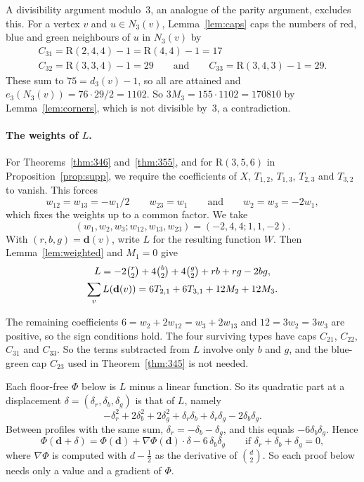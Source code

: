 \documentclass[11pt]{article}
\theoremstyle{spacedplain}
\theoremstyle{spaceddef}
\theoremstyle{spacedremark}
\newcommand{\R}{\mathrm{R}}
\begin{document}
A divisibility argument modulo~$3$, an analogue of the parity argument, excludes this.
For a vertex $v$ and $u\in N_3(v)$, Lemma~\ref{lem:caps} caps the numbers of red, blue and green neighbours of $u$ in $N_3(v)$ by
\begin{gather*}
C_{31}=\R(2,4,4)-1=\R(4,4)-1=17\\
C_{32}=\R(3,3,4)-1=29\qquad\text{and}\qquad C_{33}=\R(3,4,3)-1=29.
\end{gather*}
These sum to $75=d_3(v)-1$, so all are attained and $e_3(N_3(v))=76\cdot 29/2=1102$.
So $3M_3=155\cdot1102=170810$ by Lemma~\ref{lem:corners}, which is not divisible by~$3$, a contradiction.

\paragraph{The weights of $L$.}
For Theorems~\ref{thm:346} and~\ref{thm:355}, and for $\R(3,5,6)$ in Proposition~\ref{prop:supp}, we require the coefficients of $X$, $T_{1,2}$, $T_{1,3}$, $T_{2,3}$ and $T_{3,2}$ to vanish.
This forces
\[
w_{12}=w_{13}=-w_1/2\qquad w_{23}=w_1\qquad\text{and}\qquad w_2=w_3=-2w_1,
\]
which fixes the weights up to a common factor.
We take
\[
(w_1,w_2,w_3;w_{12},w_{13},w_{23})=(-2,4,4;1,1,-2).
\]
With $(r,b,g)=\mathbf d(v)$, write $L$ for the resulting function $W$.
Then Lemma~\ref{lem:weighted} and $M_1=0$ give
\begin{equation}\label{eq:L}
\begin{gathered}
L=-2\tbinom r2+4\tbinom b2+4\tbinom g2+rb+rg-2bg,\\
\sum_vL(\mathbf d(v))=6T_{2,1}+6T_{3,1}+12M_2+12M_3 .
\end{gathered}
\end{equation}

The remaining coefficients $6=w_2+2w_{12}=w_3+2w_{13}$ and $12=3w_2=3w_3$ are positive, so the sign conditions hold.
The four surviving types have caps $C_{21}$, $C_{22}$, $C_{31}$ and $C_{33}$.
So the terms subtracted from $L$ involve only $b$ and $g$, and the blue-green cap $C_{23}$ used in Theorem~\ref{thm:345} is not needed.

Each floor-free $\Phi$ below is $L$ minus a linear function.
So its quadratic part at a displacement $\delta=(\delta_r,\delta_b,\delta_g)$ is that of $L$, namely
\[
-\delta_r^2+2\delta_b^2+2\delta_g^2+\delta_r\delta_b+\delta_r\delta_g-2\delta_b\delta_g .
\]
Between profiles with the same sum, $\delta_r=-\delta_b-\delta_g$, and this equals $-6\delta_b\delta_g$.
Hence
\[
\Phi(\mathbf d+\delta)=\Phi(\mathbf d)+\nabla\Phi(\mathbf d)\cdot\delta-6\,\delta_b\delta_g\qquad\text{if }\delta_r+\delta_b+\delta_g=0,
\]
where $\nabla\Phi$ is computed with $d-\frac12$ as the derivative of $\binom d2$.
So each proof below needs only a value and a gradient of $\Phi$.
\end{document}
